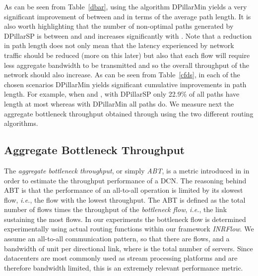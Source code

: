 \documentclass{article}
\begin{document}
\begin{table}[ht]
\begin{tabular}
\end{tabular}
\label{cfds}
\end{table}

As can be seen from Table~\ref{dbar}, using the algorithm DPillarMin yields a very significant improvement of between  and  in terms of the average path length. It is also worth highlighting that the number of non-optimal paths generated by DPillarSP is between  and  and increases significantly with . Note that a reduction in path length does not only mean that the latency experienced by network traffic should be reduced (more on this later) but also that each flow will require less aggregate bandwidth to be transmitted and so the overall throughput of the network should also increase. As can be seen from Table~\ref{cfds}, in each of the chosen scenarios DPillarMin yields significant cumulative improvements in path length. For example, when  and , with DPillarSP only 22.9\% of all paths have length at most  whereas with DPillarMin all paths do. We measure next the aggregate bottleneck throughput obtained through using the two different routing algorithms.

\subsection{Aggregate Bottleneck Throughput}
The \emph{aggregate bottleneck throughput}, or simply \emph{ABT}, is a metric introduced in \cite{GLL09} in order to estimate the throughput performance of a DCN. The reasoning behind ABT is that the performance of an all-to-all operation is limited by its slowest flow, \emph{i.e.}, the flow with the lowest throughput.  The ABT is defined as the total number of flows times the throughput of the \emph{bottleneck flow}, \emph{i.e.}, the link sustaining the most flows. In our experiments the bottleneck flow is determined experimentally using actual routing functions within our framework \emph{INRFlow\/}. We assume an all-to-all communication pattern, so that there are  flows, and a bandwidth of  unit per directional link, where  is the total number of servers. Since datacenters are most commonly used as stream processing platforms and are therefore bandwidth limited, this is an extremely relevant performance metric.
\end{document}
